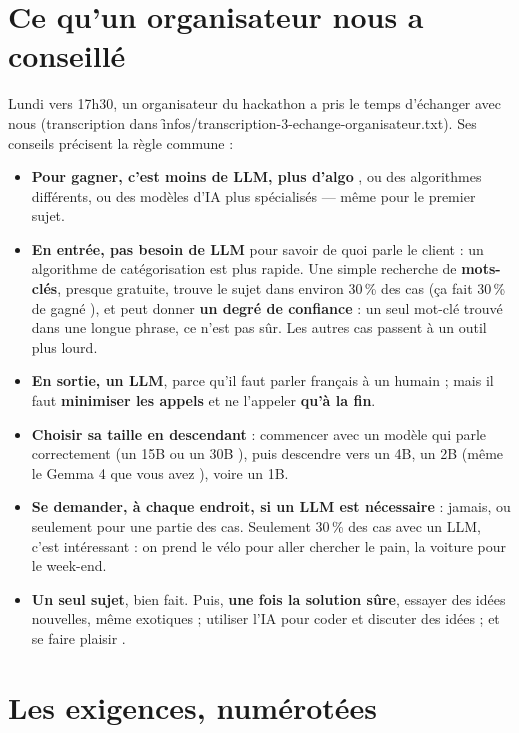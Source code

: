 \section{Ce qu'un organisateur nous a conseillé}

Lundi vers 17h30, un organisateur du hackathon a pris le temps d'échanger avec nous
(transcription dans \f{infos/transcription-3-echange-organisateur.txt}). Ses conseils précisent
la règle commune :

\begin{itemize}
  \item \textbf{\og Pour gagner, c'est moins de LLM, plus d'algo \fg}, ou des algorithmes différents,
        ou des modèles d'IA plus spécialisés --- \og même pour le premier \fg{} sujet.
  \item \textbf{En entrée, pas besoin de LLM} pour savoir de quoi parle le client : un algorithme de
        catégorisation est plus rapide. Une simple recherche de \textbf{mots-clés}, presque gratuite,
        trouve le sujet dans environ 30\,\% des cas (\og ça fait 30\,\% de gagné \fg), et peut
        donner \textbf{un degré de confiance} : un seul mot-clé trouvé dans une longue phrase, ce
        n'est pas sûr. Les autres cas passent à un outil plus lourd.
  \item \textbf{En sortie, un LLM}, parce qu'il faut parler français à un humain ; mais il faut
        \textbf{minimiser les appels} et ne l'appeler \textbf{qu'à la fin}.
  \item \textbf{Choisir sa taille en descendant} : commencer avec un modèle qui parle correctement
        (\og un 15B ou un 30B \fg), puis descendre vers un 4B, un 2B (\og même le Gemma 4 que vous
        avez \fg), voire un 1B.
  \item \textbf{Se demander, à chaque endroit, si un LLM est nécessaire} : jamais, ou seulement pour
        une partie des cas. \og Seulement 30\,\% des cas avec un LLM, c'est intéressant \fg{} : on
        prend le vélo pour aller chercher le pain, la voiture pour le week-end.
  \item \textbf{Un seul sujet}, bien fait. Puis, \textbf{une fois la solution sûre}, essayer des
        idées nouvelles, même exotiques ; utiliser l'IA pour coder et discuter des idées ; et
        \og se faire plaisir \fg.
\end{itemize}

\section{Les exigences, numérotées}
\label{sec:exigences}

